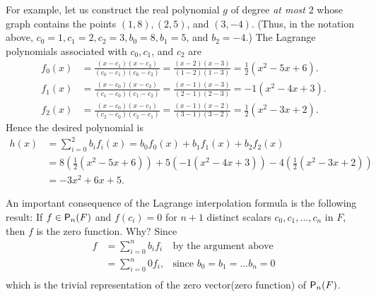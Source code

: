 For example, let us construct the real polynomial \(g\) of degree \emph{at most} \(2\) whose graph contains the points \((1, 8), (2, 5)\), and \((3, -4)\).
(Thus, in the notation above, \(c_0 = 1, c_1 = 2, c_2 = 3, b_0 = 8, b_1 = 5\), and \(b_2 = -4\).)
The Lagrange polynomials associated with \(c_0, c_1\), and \(c_2\) are
\begin{align*}
    f_0(x) & = \frac{(x - c_1)(x - c_2)}{(c_0 - c_1)(c_0 - c_2)} = \frac{(x - 2)(x - 3)}{(1 - 2)(1 - 3)} = \frac{1}{2}(x^2 - 5x + 6). \\
    f_1(x) & = \frac{(x - c_0)(x - c_2)}{(c_1 - c_0)(c_1 - c_2)} = \frac{(x - 1)(x - 3)}{(2 - 1)(2 - 3)} = -1(x^2 - 4x + 3). \\
    f_2(x) & = \frac{(x - c_0)(x - c_1)}{(c_2 - c_0)(c_2 - c_1)} = \frac{(x - 1)(x - 2)}{(3 - 1)(3 - 2)} = \frac{1}{2}(x^2 - 3x + 2).
\end{align*}
Hence the desired polynomial is
\begin{align*}
    h(x) & = \sum_{i = 0}^2 b_i f_i(x) = b_0 f_0(x) + b_1 f_1(x) + b_2 f_2(x) \\
         & = 8 (\frac{1}{2}(x^2 - 5x + 6)) + 5 (-1(x^2 - 4x + 3)) - 4 (\frac{1}{2}(x^2 - 3x + 2)) \\
         & = -3x^2 + 6x + 5.
\end{align*}

\begin{remark} \label{remark 1.6.6}
An important consequence of the Lagrange interpolation formula is the following result:
If \(f \in \textsf{P}_n(F)\) and \(f(c_i) = 0\) for \(n + 1\) distinct scalars \(c_0, c_1, ..., c_n\) in \(F\),
then \(f\) is the zero function.
Why? Since
\begin{align*}
    f & = \sum_{i = 0}^n b_i f_i & \text{by the argument above} \\
      & = \sum_{i = 0}^n 0 f_i, & \text{since \(b_0 = b_1 = ... b_n = 0\)} \\
\end{align*}
which is the trivial representation of the zero vector(zero function) of \(\textsf{P}_n(F)\).
\end{remark}